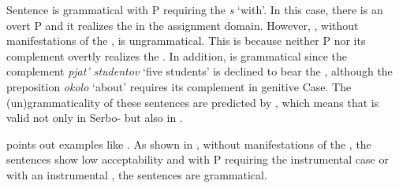 \documentclass[output=paper,colorlinks,citecolor=brown,newtxmath]{langsci/langscibook}
\begin{document}
\begin{exe}
\ex \label{gcrrRR}%
\begin{xlist}
\end{xlist}
\end{exe}

\noindent
Sentence  is grammatical with P requiring the  \textit{s} `with'. In this case, there is an overt P and it realizes the  in the assignment domain.
However, , without manifestations of the , is ungrammatical. This is because neither P nor its complement overtly realizes the .
In addition,  is grammatical since the complement \textit{pjat' studentov} `five students' is declined to bear the , although the preposition \textit{okolo} `about'
requires its complement in genitive Case.
The (un)grammaticality of these sentences are predicted by , which means that  is valid not only in Serbo- but also in .


\citet{Pesetsky2013} points out examples like .
As shown in , without manifestations of the , the sentences show low acceptability and with P requiring the {instrumental case} or with an instrumental , the sentences are grammatical.
\end{document}
